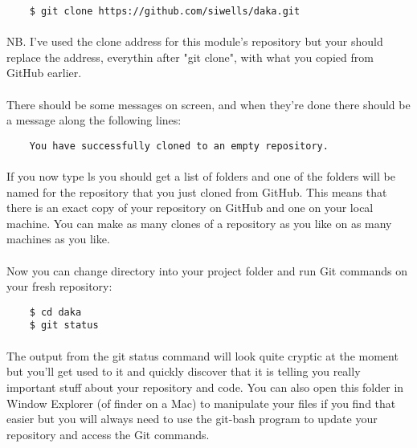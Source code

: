 \documentclass[10pt, a4paper]{article}
\begin{document}
\begin{lstlisting}
    $ git clone https://github.com/siwells/daka.git
\end{lstlisting}

\paragraph{} NB. I've used the clone address for this module's repository but your should replace the address, everythin after "git clone", with what you copied from GitHub earlier.

\paragraph{} There should be some messages on screen, and when they're done there should be a message along the following lines:
\begin{lstlisting}
    You have successfully cloned to an empty repository.
\end{lstlisting}
\paragraph{} If you now type ls you should get a list of folders and one of the folders will be named for the repository that you just cloned from GitHub. This means that there is an exact copy of your repository on GitHub and one on your local machine. You can make as many clones of a repository as you like on as many machines as you like.

\paragraph{} Now you can change directory into your project folder and run Git commands on your fresh repository:

\begin{lstlisting}
    $ cd daka
    $ git status
\end{lstlisting}

\paragraph{} The output from the git status command will look quite cryptic at the moment but you'll get used to it and quickly discover that it is telling you really important stuff about your repository and code. You can also open this folder in Window Explorer (of finder on a Mac) to manipulate your files if you find that easier but you will always need to use the git-bash program to update your repository and access the Git commands.
\end{document}
